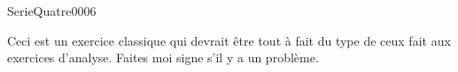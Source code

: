 
\begin{corrige}{SerieQuatre0006}

	Ceci est un exercice classique qui devrait être tout à fait du type de ceux fait aux
    exercices d'analyse. Faites moi signe s'il y a un problème.

\end{corrige}

